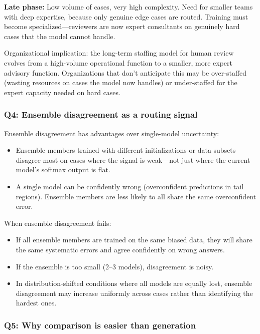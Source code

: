 \textbf{Late phase:} Low volume of cases, very high complexity. Need for smaller teams with deep expertise, because only genuine edge cases are routed. Training must become specialized---reviewers are now expert consultants on genuinely hard cases that the model cannot handle.

Organizational implication: the long-term staffing model for human review evolves from a high-volume operational function to a smaller, more expert advisory function. Organizations that don't anticipate this may be over-staffed (wasting resources on cases the model now handles) or under-staffed for the expert capacity needed on hard cases.

\subsubsection*{Q4: Ensemble disagreement as a routing signal}

Ensemble disagreement has advantages over single-model uncertainty:
\begin{itemize}
    \item Ensemble members trained with different initializations or data subsets disagree most on cases where the signal is weak---not just where the current model's softmax output is flat.
    \item A single model can be confidently wrong (overconfident predictions in tail regions). Ensemble members are less likely to all share the same overconfident error.
\end{itemize}

When ensemble disagreement fails:
\begin{itemize}
    \item If all ensemble members are trained on the same biased data, they will share the same systematic errors and agree confidently on wrong answers.
    \item If the ensemble is too small (2--3 models), disagreement is noisy.
    \item In distribution-shifted conditions where all models are equally lost, ensemble disagreement may increase uniformly across cases rather than identifying the hardest ones.
\end{itemize}

\subsubsection*{Q5: Why comparison is easier than generation}

